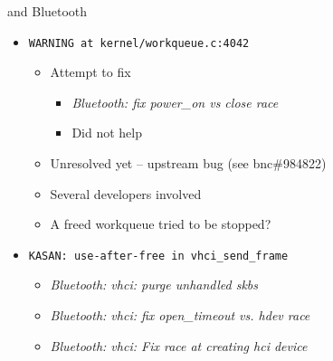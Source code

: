 \begin{frame}[fragile]{\syz and Bluetooth}

  \begin{itemize}
    \item \texttt{WARNING at kernel/workqueue.c:4042}
    \begin{itemize}
      \item Attempt to fix
      \begin{itemize}
        \item \textit{Bluetooth: fix power\_on vs close race}

	\pause

	\item Did not help
      \end{itemize}

      \pause

      \item Unresolved yet -- upstream bug (see bnc\#984822)
      \item Several developers involved
      \item A freed workqueue tried to be stopped?
    \end{itemize}

    \pause

    \item \texttt{KASAN: use-after-free in vhci\_send\_frame}
    \begin{itemize}
      \item \textit{Bluetooth: vhci: purge unhandled skbs}
      \item \textit{Bluetooth: vhci: fix open\_timeout vs. hdev race}
      \item \textit{Bluetooth: vhci: Fix race at creating hci device}
    \end{itemize}
  \end{itemize}

\end{frame}

